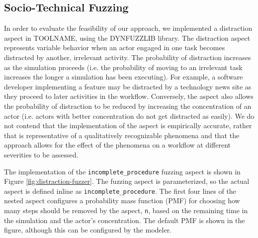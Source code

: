 \documentclass{llncs}
\begin{document}
\subsection{Socio-Technical Fuzzing}

In order to evaluate the feasibility of our approach, we implemented a distraction aspect in TOOLNAME, using the
DYNFUZZLIB library.  The distraction aspect represents variable behavior when an actor engaged in one task becomes
distracted by another, irrelevant activity.  The probability of distraction increases as the simulation proceeds
(i.e. the probability of moving to an irrelevant task increases the longer a simulation has been executing).  For
example, a software developer implementing a feature may be distracted by a technology news site as they proceed to
later activities in the workflow.  Conversely, the aspect also allows the probability of distraction to be reduced by
increasing the concentration of an actor (i.e. actors with better concentration do not get distracted as easily).  We do
not contend that the implementation of the aspect is empirically accurate, rather that is representative of a
qualitatively recognizable phenomena and that the approach allows for the effect of the phenomena on a workflow at
different severities to be assessed.

The implementation of the \lstinline!incomplete_procedure! fuzzing aspect is shown in Figure
\ref{fig:distraction-fuzzer}.  The fuzzing aspect is parameterized, so the actual aspect is defined inline as
\lstinline!incomplete_procedure!.  The first four lines of the nested aspect configures a probability mass function
(PMF) for choosing how many steps should be removed by the aspect, \lstinline!n!, based on the remaining time in the
simulation and the actor's concentration. The default PMF is shown in the figure, although this can be configured by the
modeler.
\end{document}
